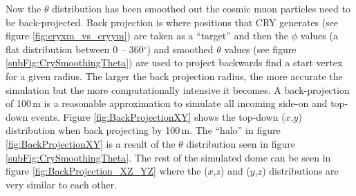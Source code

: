 Now the $\theta$ distribution has been smoothed out the cosmic muon particles need to be back-projected. Back projection is where positions that CRY generates (see figure \ref{fig:cryxm_vs_cryym}) are taken as a ``target'' and then the $\phi$ values (a flat distribution between 0 -- 360$^\circ$) and smoothed $\theta$ values (see figure \ref{subFig:CrySmoothingTheta}) are used to project backwards find a start vertex for a given radius. The larger the back projection radius, the more accurate the simulation but the more computationally intensive it becomes. A back-projection of 100\,m is a reasonable approximation to simulate all incoming side-on and top-down events. Figure \ref{fig:BackProjectionXY} shows the top-down ($x$,$y$) distribution when back projecting by 100\,m. The ``halo'' in figure \ref{fig:BackProjectionXY} is a result of the $\theta$ distribution seen in figure \ref{subFig:CrySmoothingTheta}. The rest of the simulated dome can be seen in figure \ref{fig:BackProjection_XZ_YZ} where the ($x$,$z$) and ($y$,$z$) distributions are very similar to each other. 


